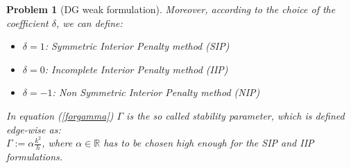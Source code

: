 \documentclass[a4paper,11pt]{article}
\newtheorem{problem}{Problem}
\begin{document}
\begin{problem}[DG weak formulation]
    \noindent Moreover, according to the choice of the coefficient $\delta$, we can define:
    \begin{itemize}
    \item $\delta=1$: Symmetric Interior Penalty method (SIP)
    \item $\delta=0$: Incomplete Interior Penalty method (IIP)
    \item $\delta=-1$: Non Symmetric Interior Penalty method (NIP) 
    \end{itemize}
     \vspace{2mm}
    \noindent In equation (\ref{forgamma}) $\Gamma$ is the so called stability parameter, which is defined edge-wise as:\\ $\Gamma := \alpha \frac{k^2}{h}$, where $ \alpha \in \mathbb{R}$ has to be chosen high enough for the SIP and IIP formulations.
    \end{problem}
\end{document}
